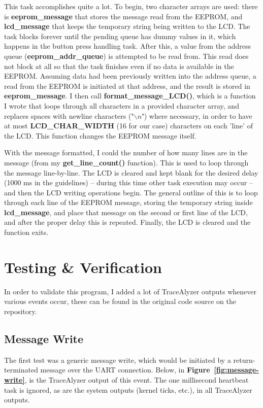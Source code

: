 \documentclass[a4paper, 12pt]{article}
\begin{document}
This task accomplishes quite a lot. To begin, two character arrays are used: there is \textbf{eeprom\_message} that stores the message read from the EEPROM, and \textbf{lcd\_message} that keeps the temporary string being written to the LCD. The task blocks forever until the pending queue has dummy values in it, which happens in the button press handling task. After this, a value from the address queue (\textbf{eeprom\_addr\_queue}) is attempted to be read from. This read does not block at all so that the task finishes even if no data is available in the EEPROM. Assuming data had been previously written into the address queue, a read from the EEPROM is initiated at that address, and the result is stored in \textbf{eeprom\_message}. I then call \textbf{format\_message\_LCD()}, which is a function I wrote that loops through all characters in a provided character array, and replaces spaces with newline characters (\textbf{'$\backslash n$'}) where necessary, in order to have at most \textbf{LCD\_CHAR\_WIDTH} (16 for our case) characters on each 'line' of the LCD. This function changes the EEPROM message itself.

With the message formatted, I could the number of how many lines are in the message (from my \textbf{get\_line\_count()} function). This is used to loop through the message line-by-line. The LCD is cleared and kept blank for the desired delay (1000 ms in the guidelines) -- during this time other task execution may occur -- and then the LCD writing operations begin. The general outline of this is to loop through each line of the EEPROM message, storing the temporary string inside \textbf{lcd\_message}, and place that message on the second or first line of the LCD, and after the proper delay this is repeated. Finally, the LCD is cleared and the function exits.
 
\section{Testing \& Verification}
In order to validate this program, I added a lot of TraceAlyzer outputs whenever various events occur, these can be found in the original code source on the repository. 

\subsection{Message Write}
The first test was a generic message write, which would be initiated by a return-terminated message over the UART connection. Below, in \textbf{Figure~\ref{fig:message-write}}, is the TraceAlyzer output of this event. The one millisecond heartbeat task is ignored, as are the system outputs (kernel ticks, etc.), in all TraceAlyzer outputs.
\end{document}

